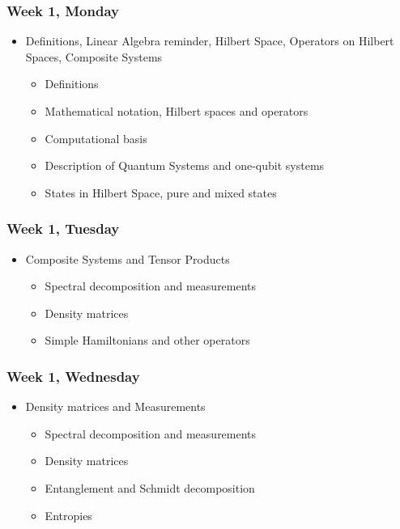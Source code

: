 \documentclass[twocolumn,superscriptaddress,amsmath,amssymb,
aps,floatfix]{revtex4-2}
\begin{document}
    \subsubsection{Week 1, Monday}\label{week-1-monday}

\begin{itemize}
\item
  Definitions, Linear Algebra reminder, Hilbert Space, Operators on
  Hilbert Spaces, Composite Systems

  \begin{itemize}
  \item
    Definitions
  \item
    Mathematical notation, Hilbert spaces and operators
  \item
    Computational basis
  \item
    Description of Quantum Systems and one-qubit systems
  \item
    States in Hilbert Space, pure and mixed states
  \end{itemize}
\end{itemize}

    \subsubsection{Week 1, Tuesday}\label{week-1-tuesday}

\begin{itemize}
\item
  Composite Systems and Tensor Products

  \begin{itemize}
  \item
    Spectral decomposition and measurements
  \item
    Density matrices
  \item
    Simple Hamiltonians and other operators
  \end{itemize}
\end{itemize}

    \subsubsection{Week 1, Wednesday}\label{week-1-wednesday}

\begin{itemize}
\item
  Density matrices and Measurements

  \begin{itemize}
  \item
    Spectral decomposition and measurements
  \item
    Density matrices
  \item
    Entanglement and Schmidt decomposition
  \item
    Entropies
  \end{itemize}
\end{itemize}
\end{document}
